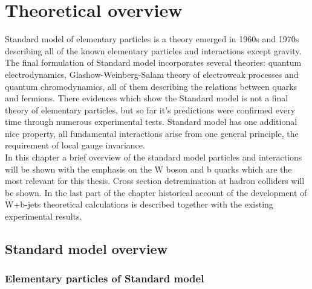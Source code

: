 
\chapter{Theoretical overview} %

\label{Chapter2} %


Standard model of elementary particles is a theory emerged in 1960s and 1970s describing all of the known elementary particles and interactions except gravity. The final formulation of Standard model incorporates several theories: quantum electrodynamics, Glashow-Weinberg-Salam theory of electroweak processes and quantum chromodynamics, all of them describing the relations between quarks and fermions. There evidences which show the Standard model is not a final theory of elementary particles, but so far it's predictions were confirmed every time through numerous experimental tests. Standard model has one additional nice property, all fundamental interactions arise from one general principle, the requirement of local gauge invariance. \\
In this chapter a brief overview of the standard model particles and interactions will be shown with the emphasis on the W boson and b quarks which are the most relevant for this thesis. Cross section detremination at hadron colliders will be shown.  In the last part of the chapter historical account of the development of W+b-jets theoretical calculations is described together with the existing experimental results.


\section{Standard model overview}



 



\subsection{Elementary particles of Standard model}

